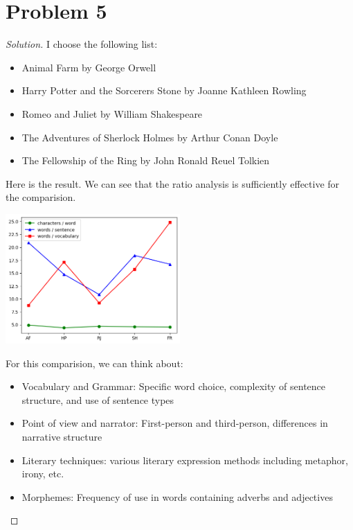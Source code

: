 \section*{Problem 5}
	\begin{proof} [Solution]
		I choose the following list:
		\begin{itemize}
			\item Animal Farm by George Orwell
			\item Harry Potter and the Sorcerer\textquotesingle s Stone by Joanne Kathleen Rowling
			\item Romeo and Juliet by William Shakespeare
			\item The Adventures of Sherlock Holmes by Arthur Conan Doyle
			\item The Fellowship of the Ring by John Ronald Reuel Tolkien
		\end{itemize}
		Here is the result. We can see that the ratio analysis is sufficiently effective for the comparision.
		\begin{center}
			\includegraphics[width=0.5\textwidth]{words.png}
		\end{center}
		For this comparision, we can think about:
		\begin{itemize}
			\item Vocabulary and Grammar: Specific word choice, complexity of sentence structure, and use of sentence types
			\item Point of view and narrator: First-person and third-person, differences in narrative structure
			\item Literary techniques: various literary expression methods including metaphor, irony, etc.
			\item Morphemes: Frequency of use in words containing adverbs and adjectives
		\end{itemize}
	\end{proof}